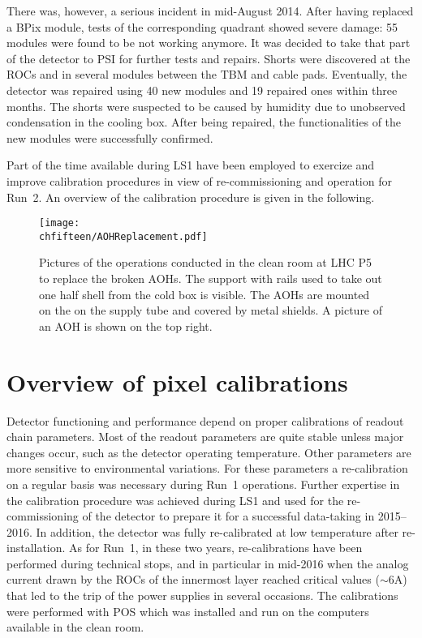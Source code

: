 There was, however, a serious incident in mid-August 2014. After having replaced a BPix module, tests of the corresponding quadrant showed severe damage: 55 modules were found to be not working anymore. It was decided to take that part of the detector to PSI for further tests and repairs. Shorts were discovered at the ROCs and in several modules between the TBM and cable pads. Eventually, the detector was repaired using 40 new modules and 19 repaired ones within three months. The shorts were suspected to be caused by humidity due to unobserved condensation in the cooling box. 
After being repaired, the functionalities of the new modules were successfully confirmed.

Part of the time available during LS1 have been employed to exercize and improve calibration procedures in view of re-commissioning and operation for Run~2.
An overview of the calibration procedure is given in the following.

\begin{figure}[!htb]
 \begin{center}
 \texttt{[image: \\chfifteen/AOHReplacement.pdf]}
 \end{center}
 \caption{Pictures of the operations conducted in the clean room at LHC P5 to replace the broken AOHs. The support with rails used to take out one half shell from the cold box is visible.
 The AOHs are mounted on the on the supply tube and covered by metal shields. A picture of an AOH is shown on the top right.}
 \label{fig:AOHreplace}
\end{figure}

\section{Overview of pixel calibrations}

Detector functioning and performance depend on proper calibrations of readout chain parameters.
Most of the readout parameters are quite stable unless major changes occur, such as the detector operating temperature.
Other parameters are more sensitive to environmental variations.
For these parameters a re-calibration on a regular basis was necessary during Run~1 operations.
Further expertise in the calibration procedure was achieved during LS1 and used 
for the re-commissioning of the detector to prepare it for a successful data-taking in 2015--2016.
In addition, the detector was fully re-calibrated at low temperature after re-installation.
As for Run~1, in these two years, re-calibrations have been performed during technical stops, and in particular in mid-2016 when the analog current drawn by the ROCs of the innermost layer reached critical values ($\sim 6$\unit{A}) that led to the trip of the power supplies in several occasions.
The calibrations were performed with POS which was installed and run on the computers available in the clean room.

